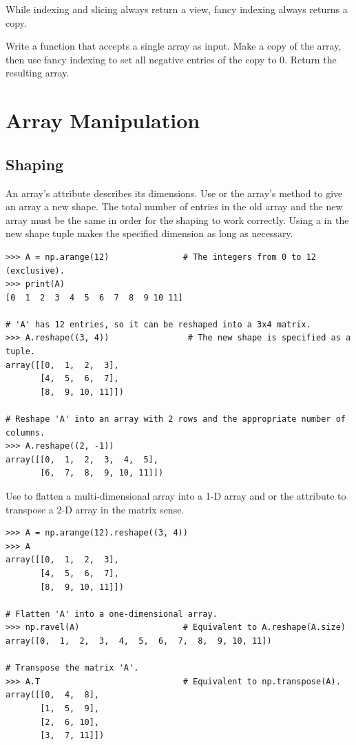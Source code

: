 While indexing and slicing always return a view, fancy indexing always returns a copy.

\begin{problem} %
Write a function that accepts a single array as input.
Make a copy of the array, then use fancy indexing to set all negative entries of the copy to $0$.
Return the resulting array.
\end{problem}

\section*{Array Manipulation} %

\subsection*{Shaping} %

An array's  attribute describes its dimensions.
Use  or the array's  method to give an array a new shape.
The total number of entries in the old array and the new array must be the same in order for the shaping to work correctly.
Using a  in the new shape tuple makes the specified dimension as long as necessary.

\begin{lstlisting}
>>> A = np.arange(12)               # The integers from 0 to 12 (exclusive).
>>> print(A)
[0  1  2  3  4  5  6  7  8  9 10 11]

# 'A' has 12 entries, so it can be reshaped into a 3x4 matrix.
>>> A.reshape((3, 4))                # The new shape is specified as a tuple.
array([[0,  1,  2,  3],
       [4,  5,  6,  7],
       [8,  9, 10, 11]])

# Reshape 'A' into an array with 2 rows and the appropriate number of columns.
>>> A.reshape((2, -1))
array([[0,  1,  2,  3,  4,  5],
       [6,  7,  8,  9, 10, 11]])
\end{lstlisting}

Use  to flatten a multi-dimensional array into a 1-D array and  or the  attribute to transpose a 2-D array in the matrix sense.

\begin{lstlisting}
>>> A = np.arange(12).reshape((3, 4))
>>> A
array([[0,  1,  2,  3],
       [4,  5,  6,  7],
       [8,  9, 10, 11]])

# Flatten 'A' into a one-dimensional array.
>>> np.ravel(A)                     # Equivalent to A.reshape(A.size)
array([0,  1,  2,  3,  4,  5,  6,  7,  8,  9, 10, 11])

# Transpose the matrix 'A'.
>>> A.T                             # Equivalent to np.transpose(A).
array([[0,  4,  8],
       [1,  5,  9],
       [2,  6, 10],
       [3,  7, 11]])
\end{lstlisting}

